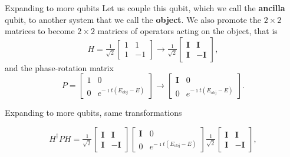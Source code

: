 \documentclass{beamer}
\begin{document}
\begin{frame}{Expanding to more qubits}
Let us couple this qubit, which we call the {\bf ancilla} qubit, to another
system that we call the {\bf object}. We also promote the $2\times 2$ matrices to
become $2\times 2$ matrices of operators acting on the object, that is 
\[
H=\tfrac{1}{\sqrt{2}}\begin{bmatrix} 1 & 1 \\ 1 & -1\end{bmatrix}\rightarrow\tfrac{1}{\sqrt{2}}\begin{bmatrix} \bm{I} & \bm{I} \\ \bm{I} & -\bm{I}\end{bmatrix},
\]
and the phase-rotation matrix
\[
P=\begin{bmatrix} 1 & 0 \\ 0 & e^{-\imath t(E_{\mathrm{obj}}-E)}\end{bmatrix}\rightarrow \begin{bmatrix} \bm{I} & 0 \\ 0 & e^{-\imath t(E_{\mathrm{obj}}-E)}\end{bmatrix}.
\]


\end{frame}

\begin{frame}{Expanding to more qubits, same transformations}

\[
H^{\dagger}PH=\tfrac{1}{\sqrt{2}}\begin{bmatrix} \bm{I} & \bm{I} \\ \bm{I} & -\bm{I}\end{bmatrix} \begin{bmatrix} \bm{I} & 0 \\ 0 & e^{-\imath t(E_{\mathrm{obj}}-E)}\end{bmatrix} \tfrac{1}{\sqrt{2}}\begin{bmatrix} \bm{I} & \bm{I} \\ \bm{I} & -\bm{I}\end{bmatrix},
\]


\end{frame}
\end{document}
